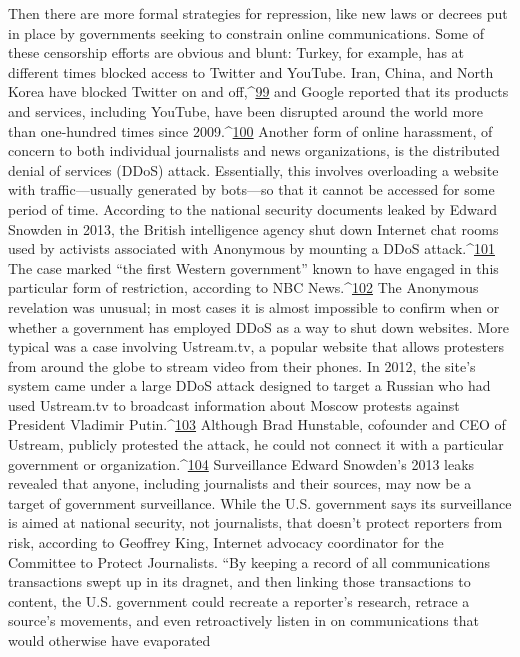 Then there are more formal strategies for repression, like new laws or decrees put in
place by governments seeking to constrain online communications. Some of these
censorship efforts are obvious and blunt: Turkey, for example, has at different times
blocked access to Twitter and YouTube. Iran, China, and North Korea have blocked
Twitter on and off,^{\href{#endnotes}{99}} and Google reported that its products and services, including
YouTube, have been disrupted around the world more than one-hundred times since
2009.^{\href{#endnotes}{100}}
Another form of online harassment, of concern to both individual journalists and news
organizations, is the distributed denial of services (DDoS) attack. Essentially, this
involves overloading a website with traffic—usually generated by bots—so that it cannot
be accessed for some period of time. According to the national security documents leaked
by Edward Snowden in 2013, the British intelligence agency shut down Internet chat
rooms used by activists associated with Anonymous by mounting a DDoS attack.^{\href{#endnotes}{101}} The
case marked ``the first Western government'' known to have engaged in this particular
form of restriction, according to NBC News.^{\href{#endnotes}{102}}
The Anonymous revelation was unusual; in most cases it is almost impossible to confirm
when or whether a government has employed DDoS as a way to shut down websites.
More typical was a case involving Ustream.tv, a popular website that allows protesters
from around the globe to stream video from their phones. In 2012, the site’s system came
under a large DDoS attack designed to target a Russian who had used Ustream.tv to
broadcast information about Moscow protests against President Vladimir Putin.^{\href{#endnotes}{103}}
Although Brad Hunstable, cofounder and CEO of Ustream, publicly protested the attack,
he could not connect it with a particular government or organization.^{\href{#endnotes}{104}}
Surveillance
Edward Snowden’s 2013 leaks revealed that anyone, including journalists and their
sources, may now be a target of government surveillance. While the U.S. government
says its surveillance is aimed at national security, not journalists, that doesn’t protect
reporters from risk, according to Geoffrey King, Internet advocacy coordinator for the
Committee to Protect Journalists. ``By keeping a record of all communications
transactions swept up in its dragnet, and then linking those transactions to content, the
U.S. government could recreate a reporter’s research, retrace a source’s movements, and
even retroactively listen in on communications that would otherwise have evaporated
